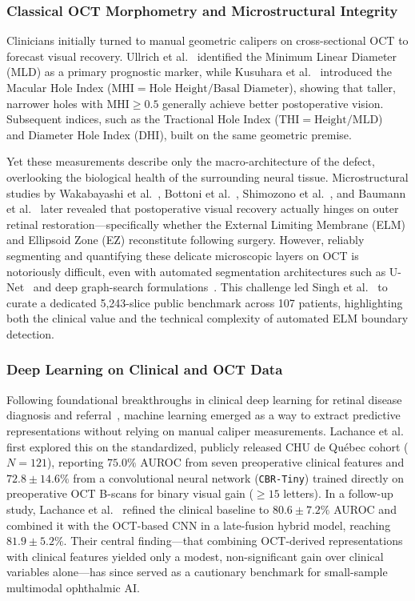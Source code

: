 \documentclass[preprint,12pt]{elsarticle}
\begin{document}
\subsubsection{Classical OCT Morphometry and Microstructural Integrity}
Clinicians initially turned to manual geometric calipers on cross-sectional OCT to forecast visual recovery. Ullrich et al.~\cite{ullrich2002} identified the Minimum Linear Diameter (MLD) as a primary prognostic marker, while Kusuhara et al.~\cite{kusuhara2004} introduced the Macular Hole Index ($\text{MHI} = \text{Hole Height} / \text{Basal Diameter}$), showing that taller, narrower holes with $\text{MHI} \ge 0.5$ generally achieve better postoperative vision. Subsequent indices, such as the Tractional Hole Index ($\text{THI} = \text{Height} / \text{MLD}$)~\cite{ruizmoreno2008} and Diameter Hole Index ($\text{DHI}$), built on the same geometric premise.

Yet these measurements describe only the macro-architecture of the defect, overlooking the biological health of the surrounding neural tissue. Microstructural studies by Wakabayashi et al.~\cite{wakabayashi2010}, Bottoni et al.~\cite{bottoni2011}, Shimozono et al.~\cite{shimozono2011}, and Baumann et al.~\cite{baumann2021} later revealed that postoperative visual recovery actually hinges on outer retinal restoration—specifically whether the External Limiting Membrane (ELM) and Ellipsoid Zone (EZ) reconstitute following surgery. However, reliably segmenting and quantifying these delicate microscopic layers on OCT is notoriously difficult, even with automated segmentation architectures such as U-Net~\cite{ronneberger2015} and deep graph-search formulations~\cite{fang2017}. This challenge led Singh et al.~\cite{singh2022} to curate a dedicated 5,243-slice public benchmark across 107 patients, highlighting both the clinical value and the technical complexity of automated ELM boundary detection.

\subsubsection{Deep Learning on Clinical and OCT Data}
Following foundational breakthroughs in clinical deep learning for retinal disease diagnosis and referral~\cite{defauw2018}, machine learning emerged as a way to extract predictive representations without relying on manual caliper measurements. Lachance et al.~\cite{lachance2021} first explored this on the standardized, publicly released CHU de Qu\'{e}bec cohort ($N=121$), reporting $75.0\%$ AUROC from seven preoperative clinical features and $72.8 \pm 14.6\%$ from a convolutional neural network (\texttt{CBR-Tiny}) trained directly on preoperative OCT B-scans for binary visual gain ($\ge 15$ letters). In a follow-up study, Lachance et al.~\cite{lachance2022} refined the clinical baseline to $80.6 \pm 7.2\%$ AUROC and combined it with the OCT-based CNN in a late-fusion hybrid model, reaching $81.9 \pm 5.2\%$. Their central finding—that combining OCT-derived representations with clinical features yielded only a modest, non-significant gain over clinical variables alone—has since served as a cautionary benchmark for small-sample multimodal ophthalmic AI.
\end{document}
